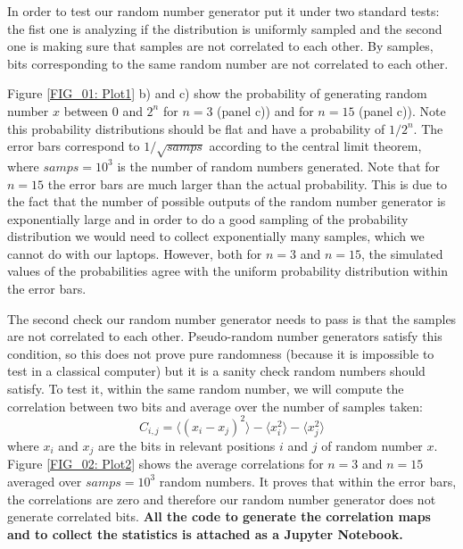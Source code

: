 \documentclass[12pt]{article}
\begin{document}
\begin{appendices}
In order to test our random number generator put it under two standard tests: the fist one is analyzing if the distribution is uniformly sampled and the second one is making sure that samples are not correlated to each other. By samples, bits corresponding to the same random number are not correlated to each other.

Figure \ref{FIG_01: Plot1} b) and c) show the probability of generating random number $x$ between 0 and $2^n$ for $n = 3$ (panel c)) and for $n = 15$ (panel c)). Note this probability distributions should be flat and have a probability of $1/2^n$. The error bars correspond to $1/\sqrt{samps}$ according to the central limit theorem, where $samps = 10^3$ is the number of random numbers generated. Note that for $n = 15$ the error bars are much larger than the actual probability. This is due to the fact that the number of possible outputs of the random number generator is exponentially large and in order to do a good sampling of the probability distribution we would need to collect exponentially many samples, which we cannot do with our laptops. However, both for $n = 3$ and $n = 15$, the simulated values of the probabilities agree with the uniform probability distribution within the error bars.

The second check our random number generator needs to pass is that the samples are not correlated to each other. Pseudo-random number generators satisfy this condition, so this does not prove pure randomness (because it is impossible to test in a classical computer) but it is a sanity check random numbers should satisfy. To test it, within the same random number, we will compute the correlation between two bits and average over the number of samples taken:
\begin{equation}
    C_{i,j} = \langle (x_i-x_j)^2 \rangle-\langle x_i^2 \rangle -\langle x_j^2 \rangle
\end{equation}
where $x_i$ and $x_j$ are the bits in relevant positions $i$ and $j$ of random number $x$. Figure \ref{FIG_02: Plot2} shows the average correlations for $n = 3$ and $n = 15$ averaged over $samps = 10^3$ random numbers. It proves that within the error bars, the correlations are zero and therefore our random number generator does not generate correlated bits. \textbf{All the code to generate the correlation maps and to collect the statistics is attached as a Jupyter Notebook.}


\end{appendices}
\end{document}

